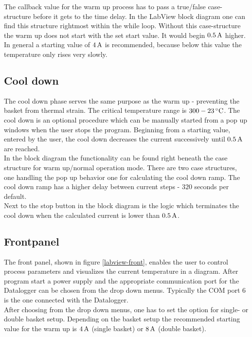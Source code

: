 \documentclass[parskip,12pt,headsepline,a4paper] {scrbook}
\begin{document}
The callback value for the warm up process has to pass a true/false case-structure before it gets to the time delay. In the LabView block diagram one can find this structure rightmost within the while loop. Without this case-structure the warm up does not start with the set start value. It would begin $\unit[0.5]{A}$ higher. In general a starting value of $\unit[4]{A}$ is recommended, because below this value the temperature only rises very slowly.

\subsection{Cool down}
\vspace{-1\baselineskip}
The cool down phase serves the same purpose as the warm up - preventing the basket from thermal strain. The critical temperature range is $\unit[300 - 23]{^\circ C}$. The cool down is an optional procedure which can be manually started from a pop up windows when the user stops the program. Beginning from a starting value, entered by the user, the cool down decreases the current successively until $\unit[0.5]{A}$ are reached. \\
In the block diagram the functionality can be found right beneath the case structure for warm up/normal operation mode. There are two case structures, one handling the pop up behavior one for calculating the cool down ramp. The cool down ramp has a higher delay between current steps - $320$ seconds per default. \\
Next to the stop button in the block diagram is the logic which terminates the cool down when the calculated current is lower than $\unit[0.5]{A}$.

\subsection{Frontpanel}
\vspace{-1\baselineskip}
The front panel, shown in figure \ref{labview-front}, enables the user to control process parameters and visualizes the current temperature in a diagram. After program start a power supply and the appropriate communication port for the Datalogger can be chosen from the drop down menus. Typically the COM port 6 is the one connected with the Datalogger. \\
After choosing from the drop down menus, one has to set the option for single- or double basket setup. Depending on the basket setup the recommended starting value for the warm up is $\unit[4]{A}$ (single basket) or $\unit[8]{A}$ (double basket).
\end{document}
